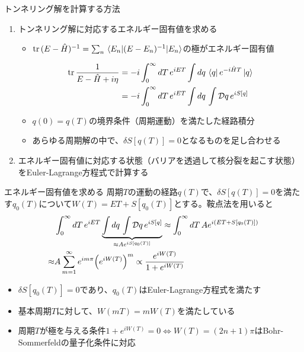 \documentclass[14pt,aspectratio=169,xcolor=dvipsnames,table,dvipdfmx]{beamer}
\theoremstyle{definition}
\begin{document}
\begin{frame}{トンネリング解を計算する方法}
  \begin{enumerate}
    \item トンネリング解に対応するエネルギー固有値を求める
          \begin{itemize}
            \item $\trace{(E-\hat{H})^{-1}}=\sum_{n}\ev{(E-E_n)^{-1}}{E_n}$の極がエネルギー固有値
          \end{itemize}
          \begin{align*}
            \trace\frac{1}{E-\hat{H}+i\eta} & =-i\int_0^{\infty}dT\,e^{iET}\int dq\,\bra{q}e^{-i\hat{H}T}\ket{q} \\
                                            & = -i\int_0^{\infty}dT\,e^{iET}\int dq\,\int\mathcal{D}q\,e^{iS[q]}
          \end{align*}
          \begin{itemize}
            \item $q(0)=q(T)$の境界条件（周期運動）を満たした経路積分
            \item あらゆる周期解の中で、$\delta S[q(T)]=0$となるものを足し合わせる
          \end{itemize}
  \end{enumerate}
  \begin{enumerate}
    \setcounter{enumi}{1}
    \item エネルギー固有値に対応する状態（バリアを透過して核分裂を起こす状態）をEuler-Lagrange方程式で計算する
  \end{enumerate}
\end{frame}

\begin{frame}{エネルギー固有値を求める}
  周期$T$の運動の経路$q(T)$で、$\delta S[q(T)]=0$を満たす$q_0(T)$について$W(T)=ET+S[q_0(T)]$とする。鞍点法を用いると
  \begin{align*}
            & \int_0^{\infty}dT\,e^{iET}\underbrace{\int dq\,\int\mathcal{D}q\,e^{iS[q]}}_{\approx Ae^{iS[q_0(T)]}}
    \approx\int_0^{\infty}dT\,Ae^{i\qty(ET + S[q_0(T)])}                                                            \\
    \approx & A\sum_{m=1}^{\infty}e^{im\pi}\qty(e^{iW(T)})^m \propto \frac{e^{iW(T)}}{1+e^{iW(T)}}
  \end{align*}
  \begin{itemize}
    \item $\delta S[q_0(T)]=0$であり、$q_0(T)$はEuler-Lagrange方程式を満たす
    \item 基本周期$T$に対して、$W(mT)=mW(T)$を満たしている
    \item 周期$T$が極を与える条件$1+e^{iW(T)}=0\Leftrightarrow W(T)=(2n+1)\pi$はBohr-Sommerfeldの量子化条件に対応
  \end{itemize}
\end{frame}
\end{document}
